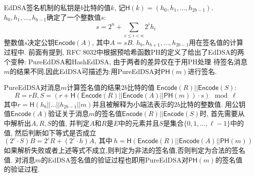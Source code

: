 EdDSA签名机制的私钥是$b$比特的值$k$, 记$\textsf{H}(k) = (h_0, h_1, \ldots, h_{2b-1})$.
$h_0, h_1, \ldots, h_{b-1}$确定了一个整数值$s$:
$$s =  2^n + \sum_{c \leq i < n}2^i h_i$$
整数值$s$决定公钥$\textsf{Encode}(A)$, 其中$A = sB$.
$h_b, h_{b+1}, \ldots, h_{2b-1}$用在签名值的计算过程中.
前面有提到, RFC 8032中根据预哈希函数\textsf{PH}的定义了给出了EdDSA的两个变种:
\textsf{PureEdDSA}和\textsf{HashEdDSA}, 由于两者的差异仅在于用\textsf{PH}处理
待签名消息$m$的结果不同,因此EdDSA可描述为:用\textsf{PureEdDSA}对$\textsf{PH}(m)$进行签名.

\textsf{PureEdDSA}对消息$m$计算签名值的结果$2b$比特的值
$\textsf{Encode}(R) || \textsf{Encode}(S)$: 
$$R = rB, S = \left(r + \textsf{H}\left(\textsf{Encode}(R) || 
\textsf{Encode}(A) || \textsf{PH}(m)\right)\cdot s \right) \mod \ell$$
其中$r = \textsf{H}(h_b || \ldots || h_{2b-1} || m)$并且被解释为小端法表示的$2b$比特的整数值.
用公钥值$\textsf{Encode}(A)$验证关于消息$m$的签名值$\textsf{Encode}(R) || \textsf{Encode}(S)$时,
首先需要从中解析出$A, R, S$的值,
并判定$A$和$R$是$E$中的元素并且$S$是集合$\{0, 1, \ldots, \ell-1\}$中的值,
然后判断如下等式是否成立
$$
(2^c \cdot S) B = 2^c  R + (2^c \cdot h) A,
\ \text{其中}\ h = \textsf{H}(\textsf{Encode}(R) || \textsf{Encode}(A) || \textsf{PH}(m))
$$
如果解析失败或者上述等式不成立,则判定为非法的签名值,否则判定为合法的签名值.
对消息$m$的EdDSA签名值的验证过程也即用\textsf{PureEdDSA}对$\textsf{PH}(m)$的签名值的验证过程.

